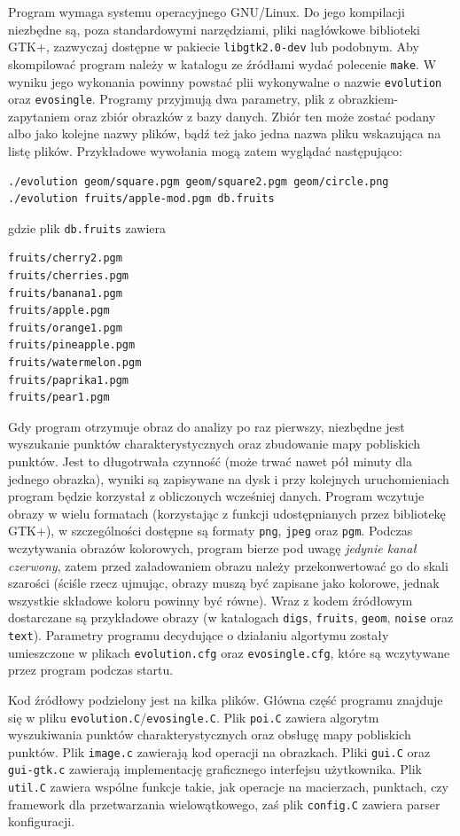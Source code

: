 \documentclass[a4paper,12pt,leqno]{article}
\begin{document}
Program wymaga systemu operacyjnego GNU/Linux. Do jego kompilacji niezbędne są, poza standardowymi narzędziami, pliki nagłówkowe biblioteki GTK+,
zazwyczaj dostępne w pakiecie \texttt{libgtk2.0-dev} lub podobnym. Aby skompilować program należy w katalogu ze źródłami wydać polecenie \texttt{make}.
W wyniku jego wykonania powinny powstać plii wykonywalne o nazwie \texttt{evolution} oraz \texttt{evosingle}. Programy przyjmują dwa parametry, plik z
obrazkiem-zapytaniem oraz zbiór obrazków z bazy danych. Zbiór ten może zostać podany albo jako kolejne nazwy plików, bądź też jako jedna nazwa pliku
wskazująca na listę plików. Przykładowe wywołania mogą zatem wyglądać następująco:
\begin{verbatim}./evolution geom/square.pgm geom/square2.pgm geom/circle.png
./evolution fruits/apple-mod.pgm db.fruits\end{verbatim}
gdzie plik \texttt{db.fruits} zawiera
\begin{verbatim}
fruits/cherry2.pgm
fruits/cherries.pgm
fruits/banana1.pgm
fruits/apple.pgm
fruits/orange1.pgm
fruits/pineapple.pgm
fruits/watermelon.pgm
fruits/paprika1.pgm
fruits/pear1.pgm
\end{verbatim}
Gdy program otrzymuje obraz do analizy po raz pierwszy, niezbędne jest wyszukanie punktów charakterystycznych oraz zbudowanie mapy pobliskich punktów.
Jest to długotrwała czynność (może trwać nawet pół minuty dla jednego obrazka), wyniki są zapisywane na dysk i przy kolejnych uruchomieniach program
będzie korzystał z obliczonych wcześniej danych. Program wczytuje obrazy w wielu formatach (korzystając z funkcji udostępnianych przez bibliotekę GTK+),
w szczególności dostępne są formaty \texttt{png}, \texttt{jpeg} oraz \texttt{pgm}. Podczas wczytywania obrazów kolorowych, program bierze pod uwagę
\emph{jedynie kanał czerwony}, zatem przed załadowaniem obrazu należy przekonwertować go do skali szarości (ściśle rzecz ujmując, obrazy muszą być zapisane
jako kolorowe, jednak wszystkie składowe koloru powinny być równe). Wraz z kodem źródłowym dostarczane są przykładowe obrazy (w katalogach \texttt{digs},
\texttt{fruits}, \texttt{geom}, \texttt{noise} oraz \texttt{text}). Parametry programu decydujące o działaniu algortymu zostały umieszczone w plikach
\texttt{evolution.cfg} oraz \texttt{evosingle.cfg}, które są wczytywane przez program podczas startu.

Kod źródłowy podzielony jest na kilka plików. Główna część programu znajduje się w pliku \texttt{evolution.C}/\texttt{evosingle.C}. Plik \texttt{poi.C}
zawiera algorytm wyszukiwania punktów charakterystycznych oraz obsługę mapy pobliskich punktów. Plik \texttt{image.c} zawierają kod operacji na obrazkach.
Pliki \texttt{gui.C} oraz \texttt{gui-gtk.c} zawierają implementację graficznego interfejsu użytkownika. Plik \texttt{util.C} zawiera wspólne funkcje takie,
jak operacje na macierzach, punktach, czy framework dla przetwarzania wielowątkowego, zaś plik \texttt{config.C} zawiera parser konfiguracji.
\end{document}
